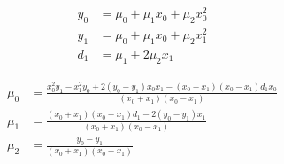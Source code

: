 \begin{align}
  y_0 & = \mu_0+\mu_1 x_0+\mu_2 x_0^{2}  \\
   y_1 & = \mu_0+\mu_1 x_0+\mu_2 x_1^{2}  \\
   d_1 & = \mu_1+2 \mu_2 x_1  
\end{align}

 
\begin{align}
  \mu_0 & = \frac
{x_0^{2} y_1 - x_1^{2} y_0+2  \left( y_0 - y_1 \right)  x_0 x_1 -  \left( x_0+x_1  \right)   \left( x_0 - x_1 \right)  d_1 x_0}
{ \left( x_0+x_1 \right)   \left(  x_0 - x_1 \right) } \\
   \mu_1 & = \frac
{ \left( x_0+x_1 \right)   \left( x_0 - x_1 \right)  d_1 -  2  \left( y_0 - y_1 \right)  x_1}
{ \left( x_0+x_1 \right)   \left( x_0 - x_1  \right) } \\
   \mu_2 & = \frac
{y_0 - y_1}
{ \left( x_0+x_1 \right)   \left( x_0  - x_1 \right) } 
\end{align}
